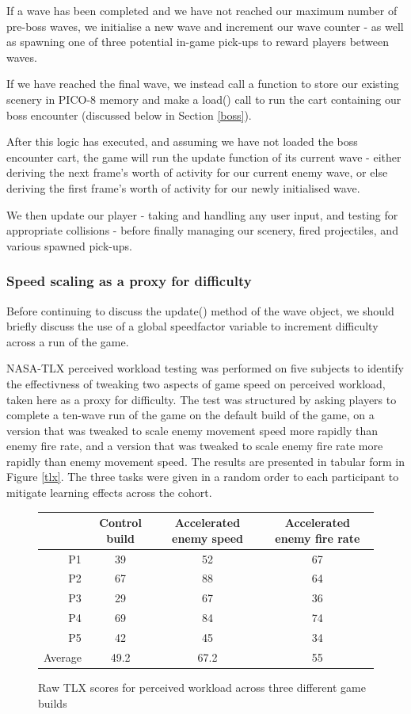 \documentclass[11pt]{article}
\begin{document}
If a wave has
been completed and we have not reached our maximum number of pre-boss waves,
we initialise a new wave and increment our wave counter - as well as spawning
one of three potential in-game pick-ups to reward players between waves.

If we have reached the final
wave, we instead call a function to store our existing scenery in PICO-8 memory and
make a load() call to run the cart containing our boss encounter (discussed below in
Section \ref{boss}).

After this logic has executed, and assuming we have not loaded the boss encounter
cart, the game will run the update function of its current wave - either deriving
the next frame's worth of activity for our current enemy wave, or else deriving the
first frame's worth of activity for our newly initialised wave.

We then update our player - taking and handling any user input, and testing for
appropriate collisions - before finally managing our scenery, fired projectiles,
and various spawned pick-ups.

\subsubsection*{Speed scaling as a proxy for difficulty}

Before continuing to discuss the update() method of the wave object, we should briefly discuss the use of
a global speed\textunderscore factor variable to increment difficulty across a run of the game.

NASA-TLX perceived workload testing\cite{nasa} was performed on five subjects to identify the effectivness of
tweaking two aspects of game speed on perceived workload, taken here as a proxy for difficulty. The test
was structured by asking players to complete a ten-wave run of the game on the default build of the game, on
a version that was tweaked to scale enemy movement speed more rapidly than enemy fire rate, and a version that
was tweaked to scale enemy fire rate more rapidly than enemy movement speed. The results are presented in tabular
form in Figure \ref{tlx}. The three tasks were given in a random order to each participant to mitigate learning
effects across the cohort.

\begin{figure}[h]
\begin{center}
\begin{tabular}{r|c|c|c}
      & Control build & Accelerated enemy speed & Accelerated enemy fire rate \\
     \hline
     P1 & 39 & 52 & 67 \\
     P2 & 67 & 88 & 64 \\
     P3 & 29 & 67 & 36 \\
     P4 & 69 & 84 & 74 \\
     P5 & 42 & 45 & 34 \\
     \hline
     Average & 49.2 & 67.2 & 55 \\
\end{tabular}
\end{center}
\caption{Raw TLX scores for perceived workload across three different game builds}
\label{fig:tlx}
\end{figure}
\end{document}
